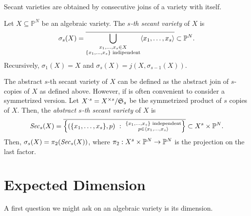 Secant varieties are obtained by consecutive joins of a variety with itself.
\begin{definition}
\label{classicalAG-definition-secantvariety}
Let $X \subseteq \mathbb{P}^N$ be an algebraic variety. The {\it $s$-th secant variety} of $X$ is 
\[
\sigma_s(X) = \overline{\bigcup_{\substack{x_1,\ldots,x_s \in X \\ \{x_1,\ldots,x_s\} \text{ indipendent}}} \langle x_1,\ldots,x_s \rangle} \subset \mathbb{P}^N.
\]
Recursively, $\sigma_1(X) = X$ and $\sigma_s(X) = j(X,\sigma_{s-1}(X))$.

The abstract $s$-th secant variety of $X$ can be defined as the abstract join of $s$-copies of $X$ as defined above. However, if is often convenient to consider a symmetrized version. Let $X^{\cdot s} = X^{\times s} / \mathfrak{S}_s$ be the symmetrized product of $s$ copies of $X$. Then, the {\it abstract $s$-th secant variety} of $X$ is 
\[
    \mathit{Sec}_s(X) = \overline{\left\{(\{x_1,\ldots,x_s\},p) ~:~ \substack{\{x_1,\ldots,x_s\} \text{ independent} \\ p \in \langle x_1,\ldots,x_s \rangle}\right\}} \subset X^s \times \mathbb{P}^N.
\]
Then, $\sigma_s(X) = \pi_2(\mathit{Sec}_s(X))$, where $\pi_2 : X^s \times \mathbb{P}^N \rightarrow \mathbb{P}^N$ is the projection on the last factor.
\end{definition}

\section{Expected Dimension}
\label{classicalAG-section-expectedDimension}
A first question we might ask on an algebraic variety is its dimension. 

